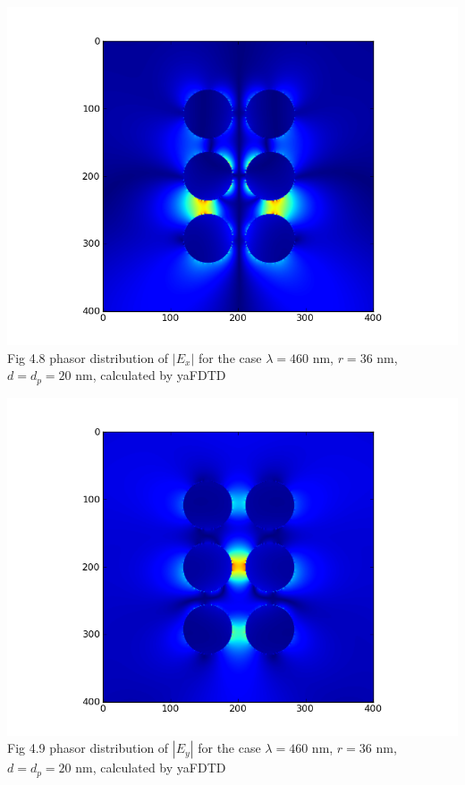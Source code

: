 \documentclass[openany]{book}
\begin{document}
\begin{center}
\includegraphics[scale=0.8]{images/ex.png}\\
Fig 4.8
phasor distribution of $|E_x|$ for the case $\lambda = 460$ nm, $r = 36$ nm, $d = d_p = 20$ nm, calculated by yaFDTD
\end{center}

\begin{center}
\includegraphics[scale=0.8]{images/ey.png}\\
Fig 4.9
phasor distribution of $|E_y|$ for the case $\lambda = 460$ nm, $r = 36$ nm, $d = d_p = 20$ nm, calculated by yaFDTD
\end{center}
\end{document}
